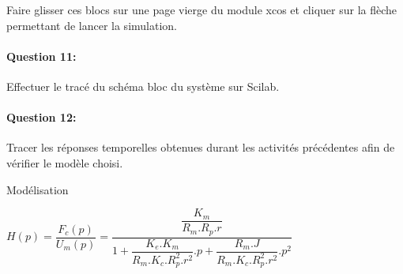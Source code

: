 Faire glisser ces blocs sur une page vierge du module xcos et cliquer sur la flèche permettant de lancer la simulation.

\paragraph{Question 11:} Effectuer le tracé du schéma bloc du système sur Scilab.

\paragraph{Question 12:} Tracer les réponses temporelles obtenues durant les activités précédentes afin de vérifier le modèle choisi.

\ifdef{\public}{}{}

\newpage

\pagestyle{correction}\setcounter{section}{0}

Modélisation
\begin{center}
$H(p)=\dfrac{F_c(p)}{U_m(p)}=\dfrac{\dfrac{K_m}{R_m.R_p.r}}{1+\dfrac{K_e.K_m}{R_m.K_c.R_p^2.r^2}.p+\dfrac{R_m.J}{R_m.K_c.R_p^2.r^2}.p^2}$
\end{center}


